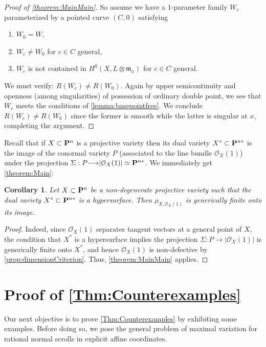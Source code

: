 \documentclass[11pt,reqno]{amsart}
\theoremstyle{plain}
\newtheorem{corollary}[theorem]{Corollary}
\theoremstyle{definition}
\theoremstyle{remark}
\numberwithin{equation}{section}
\newcommand{\cO}{{\mathcal O}}
\renewcommand{\to}{{\longrightarrow}}
\numberwithin{equation}{section}
\begin{document}
\begin{proof}[Proof of \autoref{theorem:MainMain}]
So assume we have a $1$-parameter family $W_{c}$ parameterized by a pointed curve $(C,0)$ satisfying 
\begin{enumerate}
  \item $W_{0} = W$,
  \item $W_{c} \neq W_{0}$ for $c \in C$ general,
  \item $W_{c}$ is not contained in $H^{0}(X, L \otimes {\mathfrak m}_{x})$ for $c \in C$ general.
 \end{enumerate} 
 We must verify: $R(W_{c}) \neq R(W_{0})$.  Again by upper semicontinuity and openness (among singularities) of possession of ordinary double point, we see that $W_{c}$ meets the conditions of \autoref{lemma:basepointfree}. We conclude $R(W_{c}) \neq R(W_{0})$ since the former is smooth while the latter is singular at $x$, completing the argument.
\end{proof}

Recall that if $X \subset \P^{n}$ is a projective variety then its dual variety $X^{*} \subset \P^{n*}$ is the image of the conormal variety $P$ (associated to the line bundle $\cO_{X}(1)$) under the projection $\Sigma: P \to |\cO_{X}(1)| \simeq \P^{n*}$.   We immediately get \autoref{theorem:Main}:

\begin{corollary}
  \label{cor:maintheorem} Let $X \subset \P^{n}$ be a non-degenerate projective variety such that the dual variety $X^{*} \subset \P^{n*}$ is a hypersurface. Then $\rho_{X,\cO_{X}(1)}$ is generically finite onto its image.
\end{corollary}

\begin{proof}
    Indeed, since $\cO_{X}(1)$  separates tangent vectors at a general point of $X$, the condition that $X^{*}$ is a hypersurface implies the projection $\Sigma: P \to |\cO_{X}(1)|$ is generically finite onto $X^{*}$, and hence $\cO_{X}(1)$ is non-defective by \autoref{prop:dimensionCriterion}. Thus, \autoref{theorem:MainMain} applies.
  \end{proof}


\section{Proof of \autoref{Thm:Counterexamples}} %
\label{sec:proof_of_second_result}

Our next objective is to prove \autoref{Thm:Counterexamples} by exhibiting some
examples.  Before doing so, we pose the general problem of maximal variation for rational normal scrolls in explicit affine coordinates. 
\end{document}
